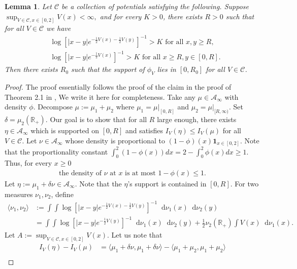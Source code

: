 \documentclass[reqno,11pt]{amsart}
\newcommand{\ind}{\mathbf{1}}
\numberwithin{equation}{section}
\newtheorem{lemma}[proposition]{Lemma}
\theoremstyle{definition}
\newcommand{\R}{\mathbb{R}}
\newcommand*\diff{\mathop{}\!\mathrm{d}}
\begin{document}
\begin{lemma} \label{l.ds972} Let $\mathcal{C}$ be a collection of potentials satisfying the following.  Suppose $\sup_{V\in \mathcal{C}, x\in [0,2]} V(x) <\infty,$ and for every $K>0$, there exists $R>0$ such that for all $V\in \mathcal{C}$ we have
\begin{align}\label{1cond}
    & \log \left[|x-y|e^{-\frac12V(x)-\frac12V(y)}\right]^{-1} > K \mbox{ for all } x,y\ge R, \\
    & \log \left[|x-y|e^{-\frac12V(x)}\right]^{-1} > K \mbox{ for all } x\ge R, y\in [0,R]. \label{2cond}
\end{align}
Then there exists $R_0$ such that the support of $\phi_V$ lies in $[0,R_0]$ for all $V\in \mathcal{C}$.
\end{lemma}
\begin{proof} The proof essentially follows the proof of the claim in the proof of Theorem 2.1 in \cite{ds97},  We write it here for completeness. Take any $\mu \in \mathcal{A}_\infty$ with density $\phi$. Decompose $\mu:=\mu_1+\mu_2$ where $\mu_1=\mu|_{[0,R]}$ and $\mu_2=\mu|_{[R,\infty)}$. Set $\delta=\mu_2(\mathbb{R}_+)$. Our goal is to show that for all $R$ large enough, there exists $\eta \in \mathcal{A}_{\infty}$ which is supported on $[0,R]$ and satisfies $I_V(\eta)\le I_V(\mu)$ for all $V\in \mathcal{C}$. Let $\nu\in \mathcal{A}_\infty$ whose density is proportional to $(1-\phi)(x)\ind_{x\in [0,2]}$. Note that the proportionality constant $\int_0^2 (1-\phi(x))dx=2-\int_0^2 \phi(x)dx \ge 1.$ Thus, for every $x\ge 0$ 
\begin{align}\label{nuine}
   \mbox{the density of $\nu$ at $x$ is at most $1-\phi(x) \le 1$.}
\end{align}
Let $\eta:=\mu_1+\delta \nu \in \mathcal{A}_\infty$. Note that the $\eta$'s support is contained in $[0,R]$. For two measures $\nu_1,\nu_2$, define
\begin{align}\nonumber
    \langle \nu_1,\nu_2\rangle & :=\int\int \log \left[|x-y|e^{-\frac12V(x)-\frac12V(y)}\right]^{-1} \diff \nu_1(x)\diff \nu_2(y) \\ & = \int\int \log \left[|x-y|e^{-\frac12V(y)}\right]^{-1} \diff \nu_1(x)\diff \nu_2(y)+\frac12\nu_2(\R_{+})\int V(x)\diff \nu_1(x). \label{2exp}
\end{align}
Let $A:=\sup_{V\in \mathcal{C},x\in [0,2]} V(x)$.
Let us note that
\begin{align}\nonumber
    I_V(\eta)-I_V(\mu) & =\langle \mu_1 +\delta\nu, \mu_1+\delta\nu\rangle-\langle \mu_1 +\mu_2, \mu_1+\mu_2\rangle \\ & 

\end{align}
\end{proof}
\end{document}

